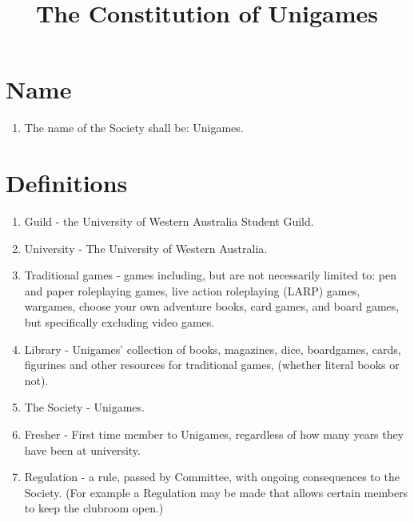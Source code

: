 \documentclass[a4paper]{article}
\title{The Constitution of Unigames}
\author{}
\date{}
\begin{document}
\maketitle


\section{Name} \label{sec:name}
\begin{enumerate}
    \item The name of the Society shall be: Unigames.
\end{enumerate}


\section{Definitions} \label{sec:definitions}
\begin{enumerate}
    \item Guild - the University of Western Australia Student Guild.
    \item University - The University of Western Australia.
    \item Traditional games - games including, but are not necessarily limited to: pen and paper roleplaying games, live action roleplaying (LARP) games, wargames, choose your own adventure books, card games, and board games, but specifically excluding video games.
    \item Library - Unigames' collection of books, magazines, dice, boardgames, cards, figurines and other resources for traditional games, (whether literal books or not).
    \item The Society - Unigames.
    \item Fresher - First time member to Unigames, regardless of how many years they have been at university.
    \item Regulation - a rule, passed by Committee, with ongoing consequences to the Society. (For example a Regulation may be made that allows certain members to keep the clubroom open.)
\end{enumerate}
\end{document}

